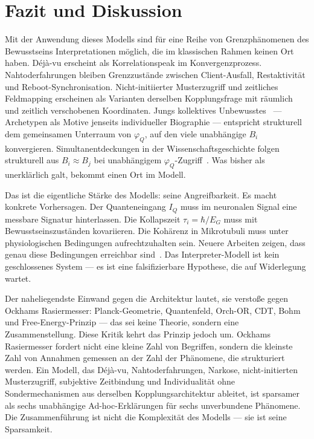 \documentclass[11pt,a4paper]{article}
\begin{document}
\section{Fazit und Diskussion}

Mit der Anwendung dieses Modells sind für eine Reihe von Grenzphänomenen
des Bewusstseins Interpretationen möglich, die im klassischen Rahmen keinen
Ort haben. Déjà-vu erscheint als Korrelationspeak im Konvergenzprozess.
Nahtoderfahrungen bleiben Grenzzustände zwischen Client-Ausfall,
Restaktivität und Reboot-Synchronisation. Nicht-initiierter Musterzugriff und zeitliches Feldmapping erscheinen als
Varianten derselben Kopplungsfrage mit räumlich und zeitlich verschobenen
Koordinaten. Jungs kollektives Unbewusstes~\citep{jung1969} — Archetypen als
Motive jenseits individueller Biographie — entspricht strukturell dem
gemeinsamen Unterraum von $\varphi_Q$, auf den viele unabhängige $B_i$
konvergieren. Simultanentdeckungen in
der Wissenschaftsgeschichte folgen strukturell aus $B_i \approx B_j$ bei
unabhängigem $\varphi_Q$-Zugriff~\citep{merton1961}. Was bisher als unerklärlich galt, bekommt einen Ort im Modell.

Das ist die eigentliche Stärke des Modells: seine Angreifbarkeit. Es macht
konkrete Vorhersagen. Der Quanteneingang $I_Q$ muss im neuronalen Signal eine
messbare Signatur hinterlassen. Die Kollapszeit $\tau_i = \hbar/E_G$ muss mit
Bewusstseinszuständen kovariieren. Die Kohärenz in Mikrotubuli muss unter
physiologischen Bedingungen aufrechtzuhalten sein. Neuere Arbeiten zeigen, dass
genau diese Bedingungen erreichbar sind~\citep{mavromatos2025,wiest2025spintronic,wiest2025active}.
Das Interpreter-Modell ist kein geschlossenes System — es ist eine
falsifizierbare Hypothese, die auf Widerlegung wartet.

Der naheliegendste Einwand gegen die Architektur lautet, sie verstoße
gegen Ockhams Rasiermesser: Planck-Geometrie, Quantenfeld, Orch-OR,
CDT, Bohm und Free-Energy-Prinzip — das sei keine Theorie, sondern
eine Zusammenstellung. Diese Kritik kehrt das Prinzip jedoch um.
Ockhams Rasiermesser fordert nicht eine kleine Zahl von Begriffen,
sondern die kleinste Zahl von Annahmen gemessen an der Zahl der
Phänomene, die strukturiert werden. Ein Modell, das Déjà-vu,
Nahtoderfahrungen, Narkose, nicht-initierten Musterzugriff,
subjektive Zeitbindung und Individualität ohne Sondermechanismen
aus derselben Kopplungsarchitektur ableitet, ist sparsamer als
sechs unabhängige Ad-hoc-Erklärungen für sechs unverbundene
Phänomene. Die Zusammenführung ist nicht die Komplexität des Modells —
sie ist seine Sparsamkeit.
\end{document}
